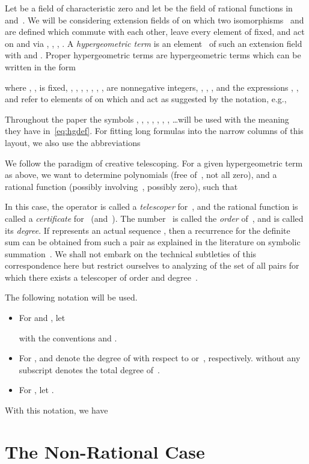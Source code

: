 \documentclass{sig-alternate}
\begin{document}
Let  be a field of characteristic zero and let  be the field of rational functions
in  and~. We will be considering extension fields  of  on which two
isomorphisms~ and  are defined which commute with each other,
leave every element of  fixed, and act on  and  via ,
, , .
A \emph{hypergeometric term} is an element~ of such an extension field~ with
 and . Proper hypergeometric terms are hypergeometric
terms which can be written in the form

where , ,  is fixed,
, , , , , , ,  are nonnegative integers,
, , ,  and the expressions ,
, and  refer to elements of  on which  and 
act as suggested by the notation, e.g.,

Throughout the paper the symbols , , , , , , , \dots will be used
with the meaning they have in~\eqref{eq:hgdef}.
For fitting long formulas into the narrow columns of this layout, we also use the abbreviations


We follow the paradigm of creative telescoping. For a given hypergeometric
term~ as above, we want to determine polynomials
 (free of~, not all zero), and a rational
function  (possibly involving~, possibly zero), such that

In this case, the operator  is called a \emph{telescoper} for~, and the rational
function  is called a \emph{certificate} for~ (and~). The
number~ is called the \emph{order} of~, and 
is called its \emph{degree}. If  represents an actual sequence , then
a recurrence for the definite sum  can be obtained from
such a pair  as explained in the literature on symbolic
summation~\cite{petkovsek97}. We shall not embark on the technical subtleties of
this correspondence here but restrict ourselves to analyzing of the set of all pairs
 for which there exists a telescoper of order  and degree~.

The following notation will be used.
\begin{itemize}
\item For  and , let
  
  with the conventions  and .
\item For ,  and  denote the degree of  with respect
  to  or~, respectively.  without any subscript denotes the total degree of~.
\item For , let .
\end{itemize}
With this notation, we have


\section{The Non-Rational Case}\label{sec:trans}
\end{document}
